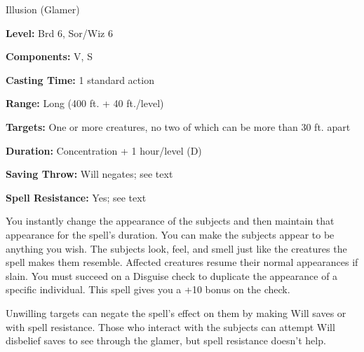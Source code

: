 
Illusion (Glamer)

\textbf{Level:} Brd 6, Sor/Wiz 6

\textbf{Components:} V, S

\textbf{Casting Time:} 1 standard action

\textbf{Range:} Long (400 ft. + 40 ft./level)

\textbf{Targets:} One or more creatures, no two of which can be more than 30 ft. 
apart

\textbf{Duration:} Concentration + 1 hour/level (D)

\textbf{Saving Throw:} Will negates; see text

\textbf{Spell Resistance:} Yes; see text

You instantly change the appearance of the subjects and then maintain that appearance 
for the spell's duration. You can make the subjects appear to be anything you wish. 
The subjects look, feel, and smell just like the creatures the spell makes them 
resemble. Affected creatures resume their normal appearances if slain. You must 
succeed on a Disguise check to duplicate the appearance of a specific individual. 
This spell gives you a +10 bonus on the check.

Unwilling targets can negate the spell's effect on them by making Will saves or 
with spell resistance. Those who interact with the subjects can attempt Will disbelief 
saves to see through the glamer, but spell resistance doesn't help.

